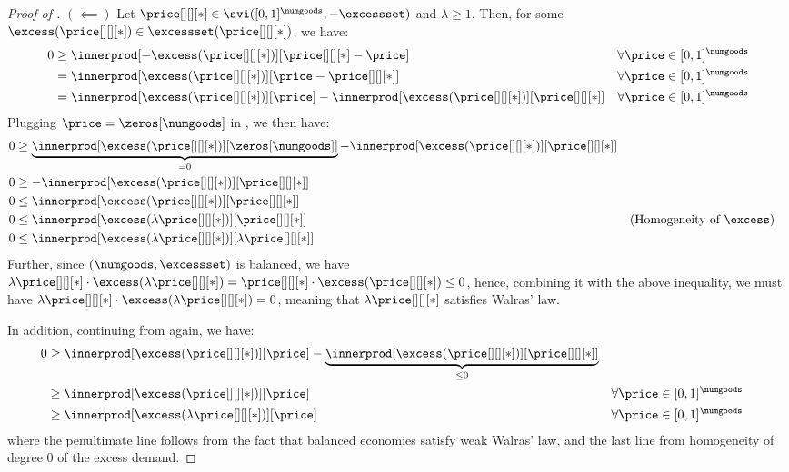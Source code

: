 \begin{proof}[Proof of ]
    $(\impliedby)$
    Let $\price[][][*] \in \svi([0, 1]^\numgoods, -\excessset)$ and $\lambda \geq 1$. Then, for some $\excess(\price[][][*]) \in \excessset(\price[][][*])$, we have:
    \begin{align}
        0&\geq \innerprod[{-\excess(\price[][][*])}][{\price[][][*] - \price}] && \forall \price \in [0, 1]^\numgoods \notag\\
        &= \innerprod[{\excess(\price[][][*])}][{\price - \price[][][*]}] && \forall \price \in [0, 1]^\numgoods \notag\\
        &= \innerprod[{\excess(\price[][][*])}][{\price}] - \innerprod[{\excess(\price[][][*])}][{\price[][][*] }] && \forall \price \in [0, 1]^\numgoods \label{eq:we_svi_eq_left}
    \end{align}
    Plugging $\price = \zeros[\numgoods]$ in , we then have: 
    \begin{align*}
        0&\geq \underbrace{\innerprod[{\excess(\price[][][*])}][{\zeros[\numgoods]}]}_{= 0} - \innerprod[{\excess(\price[][][*])}][{\price[][][*] }]\\
        0&\geq -  \innerprod[{\excess(\price[][][*])}][{\price[][][*]}]\\
        0&\leq \innerprod[{\excess(\price[][][*])}][{\price[][][*]}]\\
        0&\leq \innerprod[{\excess(\lambda \price[][][*])}][{\price[][][*]}] && \text{(Homogeneity of $\excess$)}\\
        0&\leq \innerprod[{\excess(\lambda \price[][][*])}][{\lambda \price[][][*]}] 
    \end{align*}
    Further, since $(\numgoods, \excessset)$ is balanced, we have $\lambda \price[][][*] \cdot \excess(\lambda \price[][][*]) = \price[][][*] \cdot \excess(\price[][][*]) \leq 0$, hence, combining it with the above inequality, we must have $\lambda \price[][][*] \cdot \excess(\lambda \price[][][*]) = 0$, meaning that $\lambda \price[][][*]$ satisfies Walras' law.

    In addition, continuing from  again, we have:
    \begin{align}
        0&\geq \innerprod[{\excess(\price[][][*])}][{\price}] - \underbrace{\innerprod[{\excess(\price[][][*])}][{\price[][][*] }]}_{\leq 0} \notag\\
        &\geq \innerprod[{\excess(\price[][][*])}][{\price}] && \forall \price \in [0, 1]^\numgoods\\
        &\geq \innerprod[{\excess(\lambda \price[][][*])}][{\price}] && \forall \price \in [0, 1]^\numgoods\label{eq:weak_walras_law_application}
    \end{align}
     where the penultimate line follows from the fact that balanced economies satisfy weak Walras' law, and the last line from homogeneity of degree $0$ of the excess demand.


\end{proof}
